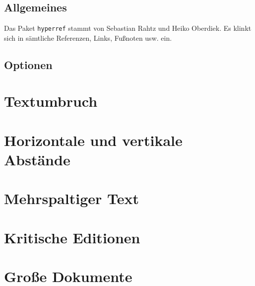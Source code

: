 \subsection{Allgemeines}
Das Paket \verb*+hyperref+ stammt von Sebastian Rahtz und Heiko Oberdiek. Es klinkt sich in sämtliche Referenzen, Links, Fußnoten usw. ein.
\subsection{Optionen}
\section{Textumbruch}
\section{Horizontale und vertikale Abstände}
\section{Mehrspaltiger Text}
\section{Kritische Editionen}
\section{Große Dokumente}



